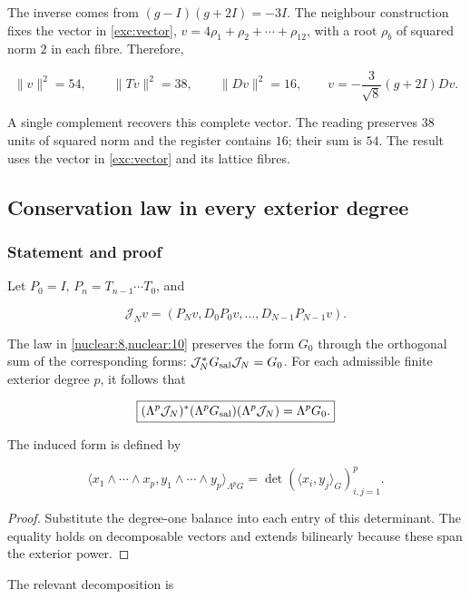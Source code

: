 The inverse comes from \((g-I)(g+2I)=-3I\). The neighbour construction fixes the vector in \eqref{exc:vector}, \(v=4\rho_1+\rho_2+\cdots+\rho_{12}\), with a root \(\rho_b\) of squared norm \(2\) in each fibre. Therefore,

\begin{equation}
\|v\|^2=54,\qquad \|Tv\|^2=38,\qquad \|Dv\|^2=16,
\qquad v=-\frac3{\sqrt8}(g+2I)Dv.
\label{nuc11:eq:19}
\end{equation}

A single complement recovers this complete vector. The reading preserves \(38\) units of squared norm and the register contains \(16\); their sum is \(54\). The result uses the vector in \eqref{exc:vector} and its lattice fibres.

\subsection{Conservation law in every exterior degree}

\subsubsection{Statement and proof}

Let \(P_0=I\), \(P_n=T_{n-1}\cdots T_0\), and

\[
\mathcal J_Nv=(P_Nv,D_0P_0v,\ldots,D_{N-1}P_{N-1}v).
\]

The law in \cref{nuclear:8,nuclear:10} preserves the form \(G_0\) through the orthogonal sum of the corresponding forms: \(\mathcal J_N^*G_{\rm sal}\mathcal J_N=G_0\). For each admissible finite exterior degree \(p\), it follows that

\begin{equation}
\boxed{
(\Lambda^p\mathcal J_N)^*(\Lambda^pG_{\rm sal})
(\Lambda^p\mathcal J_N)=\Lambda^pG_0.
}
\label{nuc11:eq:20}
\end{equation}

The induced form is defined by

\[
\langle x_1\wedge\cdots\wedge x_p,
y_1\wedge\cdots\wedge y_p\rangle_{\Lambda^pG}
=\det(\langle x_i,y_j\rangle_G)_{i,j=1}^p.
\]

\begin{proof}
Substitute the degree-one balance into each entry of this determinant. The equality holds on decomposable vectors and extends bilinearly because these span the exterior power.
\end{proof}

The relevant decomposition is

